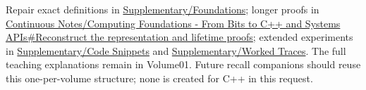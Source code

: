 Repair exact definitions in \hyperref[appendix-fd090d982a15]{Supplementary/Foundations}; longer proofs in \href{Continuous\%20Notes/Computing\%20Foundations\%20-\%20From\%20Bits\%20to\%20C++\%20and\%20Systems\%20APIs\#Reconstruct\%20the\%20representation\%20and\%20lifetime\%20proofs}{Continuous Notes/Computing Foundations - From Bits to C++ and Systems APIs\#Reconstruct the representation and lifetime proofs}; extended experiments in \hyperref[appendix-4e2236f53445]{Supplementary/Code Snippets} and \hyperref[appendix-92ff77d4dfdc]{Supplementary/Worked Traces}. The full teaching explanations remain in Volume01. Future recall companions should reuse this one-per-volume structure; none is created for C++ in this request.
